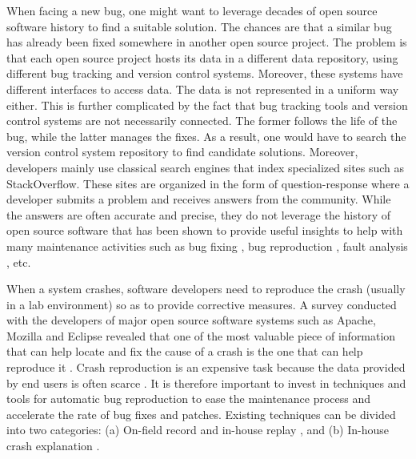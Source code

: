 When facing a new bug, one might want to leverage decades of open source software history to find a suitable solution.
The chances are that a similar bug has already been fixed somewhere  in  another  open  source  project.
The  problem  is that each open source project hosts its data in a different data repository,  using  different  bug  tracking  and  version  control systems. Moreover,  these  systems  have  different  interfaces to  access  data.
The  data  is  not  represented  in  a  uniform way  either.
This  is  further  complicated  by  the  fact  that  bug tracking tools and version control systems are not necessarily connected. The  former  follows  the  life  of  the  bug,  while  the latter  manages  the  fixes.
As  a  result,  one  would  have  to search the version control system repository to find candidate solutions.
Moreover,  developers  mainly  use  classical  search  engines that  index  specialized  sites  such  as  StackOverflow.
These sites  are  organized  in  the  form  of  question-response  where a developer submits a problem and receives answers from the community. While the answers are often accurate and precise, they do not leverage the history of open source software that has been shown to provide useful insights to help with many maintenance activities such as bug fixing \cite{Saha2014}, bug reproduction \cite{Nayrolles2015}, fault analysis \cite{Nessa2008}, etc.


When a system crashes, software developers need to reproduce the crash (usually in a lab environment) so as to provide corrective measures. A survey conducted with the developers of major open source software systems such as Apache, Mozilla and Eclipse revealed that one of the most valuable piece of information that can help locate and fix the cause of a crash is the one that can help reproduce it \cite{Bettenburg2008}. Crash reproduction is  an expensive task because the data provided by end users is often scarce \cite{Artzi2008,Jin2012,Chen2013}. It is therefore important to invest in techniques and tools for automatic bug reproduction to ease the maintenance process and accelerate the rate of bug fixes and patches.
Existing techniques can be divided into two categories: (a) On-field record and in-house replay \cite{Steven2000,Narayanasamy2005,Artzi2008,Roehm2015}, and (b) In-house crash explanation \cite{Jin2012,Jin2013,Zuddas2014,Chen2013a,Nayrolles2015}.


